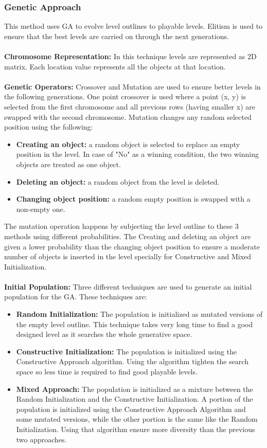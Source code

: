 \subsubsection{Genetic Approach}
This method uses GA to evolve level outlines to playable levels. Elitism is used to ensure that the best levels are carried on through the next generations.\\\\
\textbf{Chromosome Representation:} In this technique levels are represented as 2D matrix. Each location value represents all the objects at that location.\\\\
\textbf{Genetic Operators:} Crossover and Mutation are used to ensure better levels in the following generations. One point crossover is used where a point (x, y) is selected from the first chromosome and all previous rows (having smaller x) are swapped with the second chromosome. Mutation changes any random selected position using the following:
\begin{itemize} \itemsep0pt \parskip0pt 
	\item \textbf{Creating an object:} a random object is selected to replace an empty position in the level. In case of "No" as a winning condition, the two winning objects are treated as one object.
	\item \textbf{Deleting an object:} a random object from the level is deleted.
	\item \textbf{Changing object position:} a random empty position is swapped with a non-empty one.
\end{itemize}
The mutation operation happens by subjecting the level outline to these 3 methods using different probabilities. The Creating and deleting an object are given a lower probability than the changing object position to ensure a moderate number of objects is inserted in the level specially for Constructive and Mixed Initialization.\\\\
\textbf{Initial Population:} Three different techniques are used to generate an initial population for the GA. These techniques are:
\begin{itemize} \itemsep0pt \parskip0pt 
	\item \textbf{Random Initialization:} The population is initialized as mutated versions of the empty level outline. This technique takes very long time to find a good designed level as it searches the whole generative space.
	\item \textbf{Constructive Initialization:} The population is initialized using the Constructive Approach algorithm. Using the algorithm tighten the search space so less time is required to find good playable levels.
	\item \textbf{Mixed Approach:} The population is initialized as a mixture between the Random Initialization and the Constructive Initialization. A portion of the population is initialized using the Constructive Approach Algorithm and some mutated versions, while the other portion is the same like the Random Initialization. Using that algorithm ensure more diversity than the previous two approaches.
\end{itemize}
